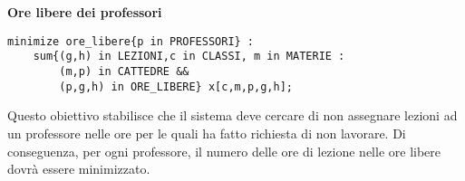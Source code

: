 \documentclass{article}
\begin{document}
\\\\\textbf{Ore libere dei professori}
\begin{verbatim}
minimize ore_libere{p in PROFESSORI} :
	sum{(g,h) in LEZIONI,c in CLASSI, m in MATERIE :
		(m,p) in CATTEDRE &&
		(p,g,h) in ORE_LIBERE} x[c,m,p,g,h];
\end{verbatim}
Questo obiettivo stabilisce che il sistema deve cercare di non assegnare lezioni ad un professore nelle ore per le quali ha fatto richiesta di non lavorare. Di conseguenza, per ogni professore, il numero delle ore di lezione nelle ore libere dovrà essere minimizzato.
\end{document}
